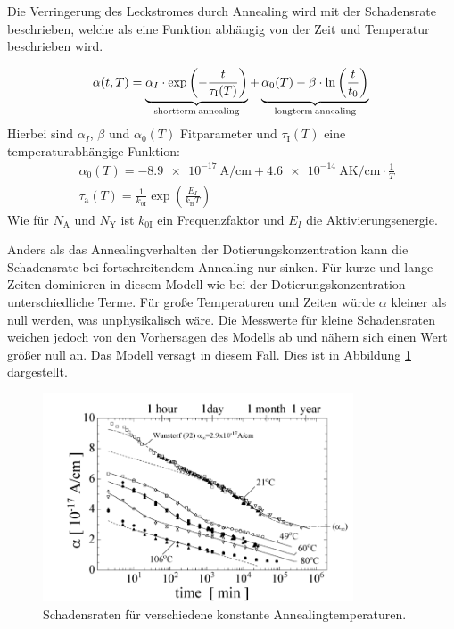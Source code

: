 Die Verringerung des Leckstromes durch Annealing wird mit der Schadensrate
beschrieben, welche als eine Funktion abhängig von der Zeit und
Temperatur beschrieben wird.\cite{moll}

\begin{align}
  \alpha(t, T) = \underbrace{\alpha_I \cdot \exp{\left(-\frac{t}{\tau_{\mathrm{I}}(T)}\right)}}_{\mathrm{shortterm \: annealing}} + \underbrace{\alpha_{\mathrm{0}}(T) -\beta \cdot \ln{\left(\frac{t}{t_{\mathrm{0}}}\right)}}_{\mathrm{longterm \: annealing}} \text{\label{eqn:damage}}
\end{align}
Hierbei sind $\alpha_I$, $\beta$ und $\alpha_{\mathrm{0}}(T)$ Fitparameter und $\tau_{\mathrm{I}}(T)$ eine
temperaturabhängige Funktion:
\begin{align}
  &\alpha_{\mathrm{0}}(T) = \SI{-8.9e-17}{\ampere\per\centi\meter} + \SI{4.6e-14}{\ampere\kelvin\per\centi\meter} \cdot \frac{1}{T} \\
  &\tau_{\mathrm{a}}(T) = \frac{1}{k_{0\mathrm{I}}}\exp{\left(\frac{E_{I}}{k_{\mathrm{B}}T}\right)}
\end{align}
Wie für $N_{\mathrm{A}}$ und $N_{\mathrm{Y}}$ ist $k_{0\mathrm{I}}$ ein Frequenzfaktor und $E_{I}$ die Aktivierungsenergie.

Anders als das Annealingverhalten der Dotierungskonzentration kann die Schadensrate
bei fortschreitendem Annealing nur sinken. Für kurze und
lange Zeiten dominieren in diesem Modell wie bei der Dotierungskonzentration unterschiedliche
Terme. Für große Temperaturen und Zeiten würde $\alpha$ kleiner als null
werden, was unphysikalisch wäre.
Die Messwerte für kleine Schadensraten weichen jedoch von den
Vorhersagen des Modells ab und nähern sich einen Wert größer null an. Das Modell versagt in diesem Fall.
Dies ist in Abbildung \ref{fig:damage_rates} dargestellt.

\begin{figure}
  \centering
  \includegraphics[width=0.82\textwidth]{logos/schadensraten.PNG}
  \caption{Schadensraten für verschiedene konstante Annealingtemperaturen.\cite{moll}}
  \label{fig:damage_rates}
\end{figure}
